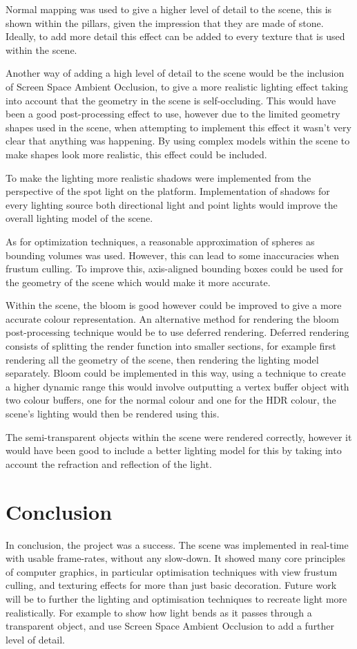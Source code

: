 \documentclass[conference]{acmsiggraph}
\begin{document}
Normal mapping was used to give a higher level of detail to the scene, this is shown within the pillars, given the impression that they are made of stone. Ideally, to add more detail this effect can be added to every texture that is used within the scene.

Another way of adding a high level of detail to the scene would be the inclusion of Screen Space Ambient Occlusion, to give a more realistic lighting effect taking into account that the geometry in the scene is self-occluding. This would have been a good post-processing effect to use, however due to the limited geometry shapes used in the scene, when attempting to implement this effect it wasn't very clear that anything was happening. By using complex models within the scene to make shapes look more realistic, this effect could be included.

To make the lighting more realistic shadows were implemented from the perspective of the spot light on the platform. Implementation of shadows for every lighting source both directional light and point lights would improve the overall lighting model of the scene.

As for optimization techniques, a reasonable approximation of spheres as bounding volumes was used. However, this can lead to some inaccuracies when frustum culling. To improve this, axis-aligned bounding boxes could be used for the geometry of the scene which would make it more accurate.

Within the scene, the bloom is good however could be improved to give a more accurate colour representation. An alternative method for rendering the bloom post-processing technique would be to use deferred rendering. Deferred rendering consists of splitting the render function into smaller sections, for example first rendering all the geometry of the scene, then rendering the lighting model separately. Bloom could be implemented in this way, using a technique to create a higher dynamic range this would involve outputting a vertex buffer object with two colour buffers, one for the normal colour and one for the HDR colour, the scene's lighting would then be rendered using this.

The semi-transparent objects within the scene were rendered correctly, however it would have been good to include a better lighting model for this by taking into account the refraction and reflection of the light.
	
\section{Conclusion}
In conclusion, the project was a success. The scene was implemented in real-time with usable frame-rates, without any slow-down. It showed many core principles of computer graphics, in particular optimisation techniques with view frustum culling, and texturing effects for more than just basic decoration. Future work will be to further the lighting and optimisation techniques to recreate light more realistically. For example to show how light bends as it passes through a transparent object, and use Screen Space Ambient Occlusion to add a further level of detail.


	
	
\end{document}
